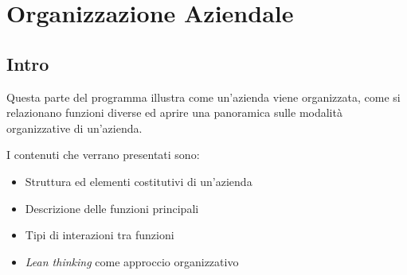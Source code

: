 \section{Organizzazione Aziendale}

\subsection{Intro}
Questa parte del programma illustra come un'azienda viene organizzata, come si relazionano funzioni diverse ed aprire una panoramica sulle modalità organizzative di un'azienda.

I contenuti che verrano presentati sono:
\begin{itemize}
	\item Struttura ed elementi costitutivi di un’azienda
	\item Descrizione delle funzioni principali
	\item Tipi di interazioni tra funzioni
	\item \textit{Lean thinking} come approccio organizzativo
\end{itemize}




\newpage

\newpage
